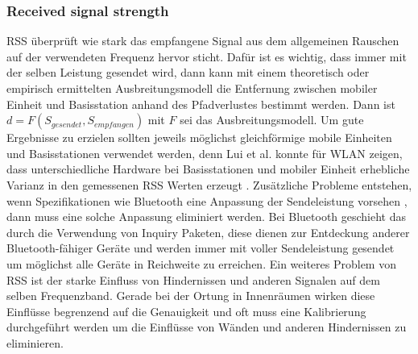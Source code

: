 \subsubsection{Received signal strength}
RSS überprüft wie stark das empfangene Signal aus dem allgemeinen Rauschen auf der verwendeten Frequenz hervor sticht. Dafür ist es wichtig, dass immer mit der selben Leistung gesendet wird, dann kann mit einem theoretisch oder empirisch ermittelten Ausbreitungsmodell die Entfernung zwischen mobiler Einheit und Basisstation anhand des Pfadverlustes bestimmt werden. Dann ist $d = F(S_{gesendet},S_{empfangen})$ mit $F$ sei das Ausbreitungsmodell. Um gute Ergebnisse zu erzielen sollten jeweils möglichst gleichförmige mobile Einheiten und Basisstationen verwendet werden, denn Lui et al. konnte für WLAN zeigen, dass unterschiedliche Hardware bei Basisstationen und mobiler Einheit erhebliche Varianz in den gemessenen RSS Werten erzeugt \cite{lui2011differences}. Zusätzliche Probleme entstehen, wenn Spezifikationen wie Bluetooth eine Anpassung der Sendeleistung vorsehen \cite{hossain2007comprehensive}, dann muss eine solche Anpassung eliminiert werden. 
Bei Bluetooth geschieht das durch die Verwendung von Inquiry Paketen, diese dienen zur Entdeckung anderer Bluetooth-fähiger Geräte und werden immer mit voller Sendeleistung gesendet um möglichst alle Geräte in Reichweite zu erreichen.
Ein weiteres Problem von RSS ist der starke Einfluss von Hindernissen und anderen  Signalen auf dem selben Frequenzband. Gerade bei der Ortung in Innenräumen wirken diese Einflüsse begrenzend auf die Genauigkeit und oft muss eine Kalibrierung durchgeführt werden um die Einflüsse von Wänden und anderen Hindernissen zu eliminieren.




